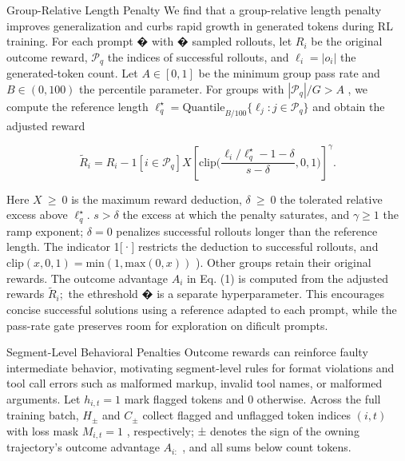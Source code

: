 \documentclass[
  10
]{article}
\begin{document}
Group-Relative Length Penalty We find that a group-relative length
penalty improves generalization and curbs rapid growth in generated
tokens during RL training. For each prompt � with � sampled rollouts,
let \(R _ { i }\) be the original outcome reward,
\(\mathcal { P } _ { q }\) the indices of successful rollouts, and
\(\ell _ { i } = | o _ { i } |\) the generated-token count. Let
\(A \in [ 0 , 1 ]\) be the minimum group pass rate and
\(B \in ( 0 , 1 0 0 )\) the percentile parameter. For groups with
\(| { \mathcal { P } } _ { q } | / G > A\) , we compute the reference
length
\(\ell _ { q } ^ { \star } = \mathrm { Q u a n t i l e } _ { B / 1 0 0 } \{ \ell _ { j } : j \in \mathcal { P } _ { q } \}\)
and obtain the adjusted reward

\[
\widetilde {R} _ {i} = R _ {i} - 1 [ i \in \mathcal {P} _ {q} ] X \left[ \mathrm{clip} \bigg (\frac {\ell_ {i} / \ell_ {q} ^ {\star} - 1 - \delta}{s - \delta}, 0, 1 \bigg) \right] ^ {\gamma}.\tag{4}
\]

Here \(X ~ \geq ~ 0\) is the maximum reward deduction,
\(\delta \ \geq \ 0\) the tolerated relative excess above
\(\ell _ { q } ^ { \star } .\) \(s > \delta\) the excess at which the
penalty saturates, and \(\gamma \geq 1\) the ramp exponent;
\(\delta = 0\) penalizes successful rollouts longer than the reference
length. The indicator 1{[}·{]} restricts the deduction to successful
rollouts, and
\(\mathrm { c l i p } ( x , 0 , 1 ) = \mathrm { m i n } ( 1 , \mathrm { m a x } ( 0 , x ) )\)
). Other groups retain their original rewards. The outcome advantage
\(A _ { i }\) in Eq. (1) is computed from the adjusted rewards
\(\widetilde { R } _ { i } ;\) the ethreshold � is a separate
hyperparameter. This encourages concise successful solutions using a
reference adapted to each prompt, while the pass-rate gate preserves
room for exploration on dificult prompts.

Segment-Level Behavioral Penalties Outcome rewards can reinforce faulty
intermediate behavior, motivating segment-level rules for format
violations and tool call errors such as malformed markup, invalid tool
names, or malformed arguments. Let \(h _ { i , t } = 1\) mark flagged
tokens and 0 otherwise. Across the full training batch, \(H _ { \pm }\)
and \(C _ { \pm }\) collect flagged and unflagged token indices
\(( i , t )\) with loss mask \(M _ { i , t } = 1\) , respectively; ±
denotes the sign of the owning trajectory's outcome advantage
\(A _ { i : }\) , and all sums below count tokens.
\end{document}
